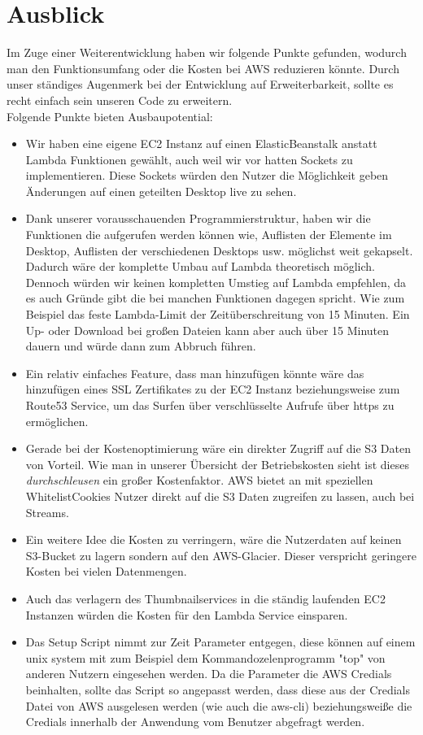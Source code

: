 \documentclass[a4paper, 12pt]{scrreprt}
\renewcommand\_{\textunderscore\allowbreak}
\begin{document}
   

\chapter{Ausblick}
Im Zuge einer Weiterentwicklung haben wir folgende Punkte gefunden, wodurch man den Funktionsumfang oder die Kosten bei AWS reduzieren könnte. Durch unser ständiges Augenmerk bei der Entwicklung auf Erweiterbarkeit, sollte es recht einfach sein unseren Code zu erweitern. \\
Folgende Punkte bieten Ausbaupotential:
\begin{itemize}
\item Wir haben eine eigene EC2 Instanz auf einen ElasticBeanstalk anstatt Lambda Funktionen gewählt, auch weil wir vor hatten Sockets zu implementieren. Diese Sockets würden den Nutzer die Möglichkeit geben Änderungen auf einen geteilten Desktop live zu sehen. 
\item Dank unserer vorausschauenden Programmierstruktur, haben wir die Funktionen die aufgerufen werden können wie, Auflisten der Elemente im Desktop, Auflisten der verschiedenen Desktops usw. möglichst weit gekapselt. Dadurch wäre der komplette Umbau auf Lambda theoretisch möglich. Dennoch würden wir keinen kompletten Umstieg auf Lambda empfehlen, da es auch Gründe gibt die bei manchen Funktionen dagegen spricht. Wie zum Beispiel das feste Lambda-Limit der Zeitüberschreitung von 15 Minuten. Ein Up- oder Download bei großen Dateien kann aber auch über 15 Minuten dauern und würde dann zum Abbruch führen.
\item Ein relativ einfaches Feature, dass man hinzufügen könnte wäre das hinzufügen eines SSL Zertifikates zu der EC2 Instanz beziehungsweise zum Route53 Service, um das Surfen über verschlüsselte Aufrufe über https zu ermöglichen. 
\item Gerade bei der Kostenoptimierung wäre ein direkter Zugriff auf die S3 Daten von Vorteil. Wie man in unserer Übersicht der Betriebskosten sieht ist dieses \emph{durchschleusen} ein großer Kostenfaktor. AWS bietet an mit speziellen \glqq Whitelist\grqq  Cookies Nutzer direkt auf die S3 Daten zugreifen zu lassen, auch bei Streams.
\item Ein weitere Idee die Kosten zu verringern, wäre die Nutzerdaten auf keinen S3-Bucket zu lagern sondern auf den AWS-Glacier. Dieser verspricht geringere Kosten bei vielen Datenmengen.
\item Auch das verlagern des Thumbnailservices in die ständig laufenden EC2 Instanzen würden die Kosten für den Lambda Service einsparen.
\item Das Setup Script nimmt zur Zeit Parameter entgegen, diese können auf einem unix system mit zum Beispiel dem Kommandozelenprogramm "top" von anderen Nutzern eingesehen werden. Da die Parameter die AWS Credials beinhalten, sollte das Script so angepasst werden, dass diese aus der Credials Datei von AWS ausgelesen werden (wie auch die aws-cli) beziehungsweiße die Credials innerhalb der Anwendung vom Benutzer abgefragt werden.
\end{itemize}


\clearpage


%
\end{document}
